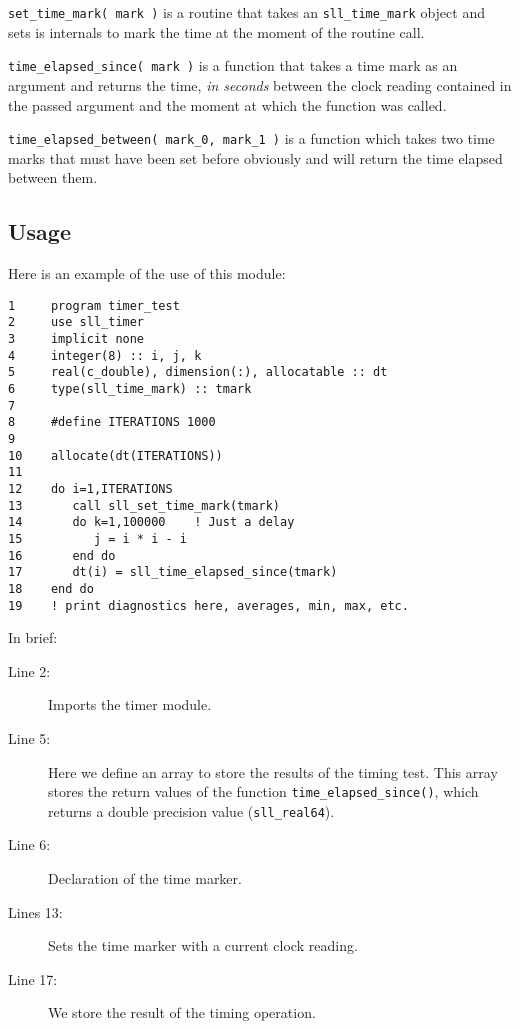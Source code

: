 \documentclass[]{report}   %
\begin{document}
\verb+set_time_mark( mark )+ is a routine that takes an \verb+sll_time_mark+ object and sets is internals to mark the time at the moment of the routine call.

\verb+time_elapsed_since( mark )+ is a function that takes a time mark as an argument and returns the time, \emph{in seconds} between the clock reading contained in the passed argument and the moment at which the function was called.

\verb+time_elapsed_between( mark_0, mark_1 )+ is a function which takes two time marks that must have been set before obviously and will return the time elapsed between them.



\subsection{Usage}
Here is an example of the use of this module:

\begin{verbatim}
1     program timer_test
2     use sll_timer
3     implicit none
4     integer(8) :: i, j, k
5     real(c_double), dimension(:), allocatable :: dt
6     type(sll_time_mark) :: tmark
7
8     #define ITERATIONS 1000
9 
10    allocate(dt(ITERATIONS))
11
12    do i=1,ITERATIONS
13       call sll_set_time_mark(tmark)
14       do k=1,100000    ! Just a delay
15          j = i * i - i
16       end do
17       dt(i) = sll_time_elapsed_since(tmark) 
18    end do
19    ! print diagnostics here, averages, min, max, etc.
\end{verbatim}

In brief:
\begin{description}
\item[Line 2:]
Imports the timer module. 

\item[Line 5:]
Here we define an array to store the results of the timing test. This array stores the return values of the function \verb+time_elapsed_since()+, which returns a double precision value (\verb+sll_real64+).

\item[Line 6: ]
Declaration of the time marker.

\item[Lines 13:]
Sets the time marker with a current clock reading.

\item[Line 17:]
We store the result of the timing operation.
\end{description}
\end{document}
